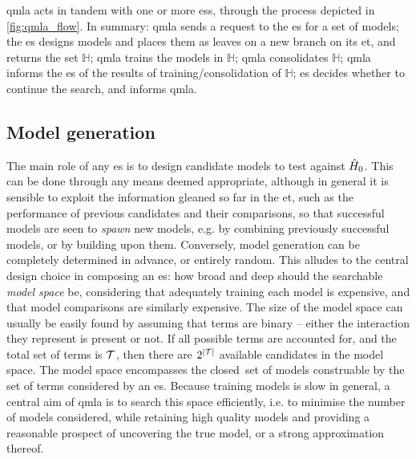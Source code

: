 \gls{qmla} acts in tandem with one or more \glspl{es}, through the process depicted in \cref{fig:qmla_flow}. 
In summary: 
    \gls{qmla} sends a request to the \gls{es} for a set of models; 
    the \gls{es} designs models and places them as leaves on a new branch on its \gls{et}, and returns the set $\mathbb{H}$; 
    \gls{qmla} trains the models in $\mathbb{H}$; 
    \gls{qmla} consolidates $\mathbb{H}$;
    \gls{qmla} informs the \gls{es} of the results of training/consolidation of $\mathbb{H}$; 
    \gls{es} decides whether to continue the search, and informs \gls{qmla}.


\subsection{Model generation}\label{sec:model_generation}
The main role of any \gls{es} is to design candidate models to test against $\hat{H}_0$. 
This can be done through any means deemed appropriate, 
    although in general it is sensible to exploit the information gleaned so far in the \gls{et}, 
    such as the performance of previous candidates and their comparisons, 
    so that successful models are seen to \emph{\gls{spawn}} new models, 
    e.g. by combining previously successful models, or by building upon them. 
Conversely, model generation can be completely determined in advance, or entirely random.
This alludes to the central design choice in composing an \gls{es}: 
    how broad and deep should the searchable \emph{\gls{model space}} be, 
    considering that adequately training each model
    is expensive, and that model comparisons are similarly expensive. 
The size of the \gls{model space} can usually be easily found 
    by assuming that terms are binary -- either the interaction they represent is present or not. 
If all possible terms are accounted for, and the total set of terms is $\mathcal{T}$,
    then there are $2^{\left\lvert \mathcal{T} \right\rvert}$ available candidates in the model space. 
The \gls{model space} encompasses the closed\footnotemark \ set of models construable by the set of terms considered by an \gls{es}. 
Because training models is slow in general,
    a central aim of \gls{qmla} is to search this space efficiently,
    i.e. to minimise the number of models considered, while retaining high quality models and 
    providing a reasonable prospect of uncovering the \gls{true model}, or a strong approximation thereof. 




